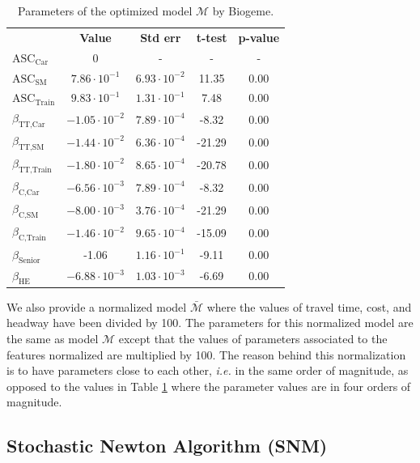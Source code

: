 \documentclass[conference]{IEEEtran}
\newcommand{\E}[1]{\cdot10^{#1}}
\begin{document}
\begin{table}
\centering
\renewcommand\arraystretch{1.2}
\begin{tabular}{l|cccc}
\multicolumn{1}{l}{} & {\bf Value} & {\bf Std err} & {\bf t-test} & {\bf p-value} \\ \cline{2-5}
$\text{ASC}_{\text{Car}}$ & 0 & - & - & - \\
$\text{ASC}_{\text{SM}}$ & $7.86\E{-1}$ & $6.93\E{-2}$ & 11.35 & 0.00 \\
$\text{ASC}_{\text{Train}}$ & $9.83\E{-1}$ & $1.31\E{-1}$ & 7.48 & 0.00 \\
$\beta_{\text{TT,Car}}$ & $-1.05\E{-2}$ & $7.89\E{-4}$ & -8.32 & 0.00 \\
$\beta_{\text{TT,SM}}$ & $-1.44\E{-2}$ & $6.36\E{-4}$ & -21.29 & 0.00 \\
$\beta_{\text{TT,Train}}$ & $-1.80\E{-2}$ & $8.65\E{-4}$ & -20.78 & 0.00 \\
$\beta_{\text{C,Car}}$ & $-6.56\E{-3}$ & $7.89\E{-4}$ & -8.32 & 0.00 \\
$\beta_{\text{C,SM}}$ & $-8.00\E{-3}$ & $3.76\E{-4}$ & -21.29 & 0.00 \\
$\beta_{\text{C,Train}}$ & $-1.46\E{-2}$ & $9.65\E{-4}$ & -15.09 & 0.00 \\
$\beta_{\text{Senior}}$ & -1.06 & $1.16\E{-1}$ & -9.11 & 0.00 \\
$\beta_{\text{HE}}$ & $-6.88\E{-3}$ & $1.03\E{-3}$ & -6.69 & 0.00
\end{tabular}
\caption{\label{tab:res_biogeme} Parameters of the optimized model $\mathcal{M}$ by Biogeme.}
\vspace{-0.8cm}
\end{table}

We also provide a normalized model $\bar{\mathcal{M}}$ where the values of travel time, cost, and headway have been divided by 100. The parameters for this normalized model are the same as model $\mathcal{M}$ except that the values of parameters associated to the features normalized are multiplied by 100. The reason behind this normalization is to have parameters close to each other, {\it i.e.} in the same order of magnitude, as opposed to the values in Table \ref{tab:res_biogeme} where the parameter values are in four orders of magnitude. \\


\vspace{-0.3cm}
\subsection{Stochastic Newton Algorithm (SNM)}
\label{sec:snm}
\end{document}
